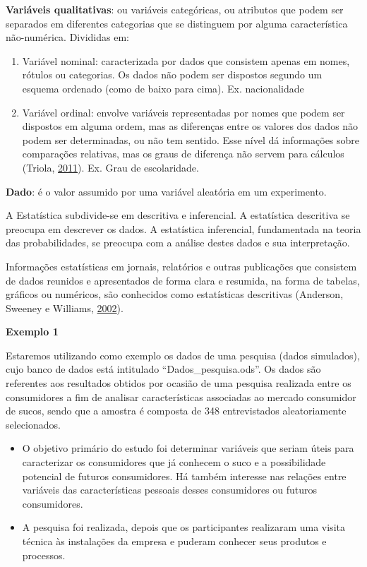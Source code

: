 \documentclass[12pt,brazil,oneside]{book}
\begin{document}
\textbf{Variáveis qualitativas}: ou variáveis categóricas, ou atributos que podem ser separados em diferentes categorias que se distinguem por alguma característica não-numérica. Divididas em:

\begin{enumerate}
\def\labelenumi{\alph{enumi})}
\item
  Variável nominal: caracterizada por dados que consistem apenas em nomes, rótulos ou categorias. Os dados não podem ser dispostos segundo um esquema ordenado (como de baixo para cima). Ex. nacionalidade
\item
  Variável ordinal: envolve variáveis representadas por nomes que podem ser dispostos em alguma ordem, mas as diferenças entre os valores dos dados não podem ser determinadas, ou não tem sentido. Esse nível dá informações sobre comparações relativas, mas os graus de diferença não servem para cálculos (Triola, \protect\hyperlink{ref-triola1999}{2011}). Ex. Grau de escolaridade.
\end{enumerate}

\textbf{Dado}: é o valor assumido por uma variável aleatória em um experimento.

A Estatística subdivide-se em descritiva e inferencial. A estatística descritiva se preocupa em descrever os dados. A estatística inferencial, fundamentada na teoria das probabilidades, se preocupa com a análise destes dados e sua interpretação.

Informações estatísticas em jornais, relatórios e outras publicações que consistem de dados reunidos e apresentados de forma clara e resumida, na forma de tabelas, gráficos ou numéricos, são conhecidos como estatísticas descritivas (Anderson, Sweeney e Williams, \protect\hyperlink{ref-anderson2002}{2002}).

\textbf{Exemplo 1}

Estaremos utilizando como exemplo os dados de uma pesquisa (dados simulados), cujo banco de dados está intitulado ``Dados\_pesquisa.ods''. Os dados são referentes aos resultados obtidos por ocasião de uma pesquisa realizada entre os consumidores a fim de analisar características associadas ao mercado consumidor de sucos, sendo que a amostra é composta de 348 entrevistados aleatoriamente selecionados.

\begin{itemize}
\item
  O objetivo primário do estudo foi determinar variáveis que seriam úteis para caracterizar os consumidores que já conhecem o suco e a possibilidade potencial de futuros consumidores. Há também interesse nas relações entre variáveis das características pessoais desses consumidores ou futuros consumidores.
\item
  A pesquisa foi realizada, depois que os participantes realizaram uma visita técnica às instalações da empresa e puderam conhecer seus produtos e processos.
\end{itemize}
\end{document}
